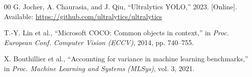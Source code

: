 \documentclass[conference]{IEEEtran}
\begin{document}
\begin{thebibliography}{00}
 G. Jocher, A. Chaurasia, and J. Qiu, ``Ultralytics YOLO,'' 2023. [Online]. Available: \url{https://github.com/ultralytics/ultralytics}

 T.-Y. Lin et al., ``Microsoft COCO: Common objects in context,'' in \textit{Proc. European Conf. Computer Vision (ECCV)}, 2014, pp. 740--755.

 X. Bouthillier et al., ``Accounting for variance in machine learning benchmarks,'' in \textit{Proc. Machine Learning and Systems (MLSys)}, vol. 3, 2021.

\end{thebibliography}
\end{document}
